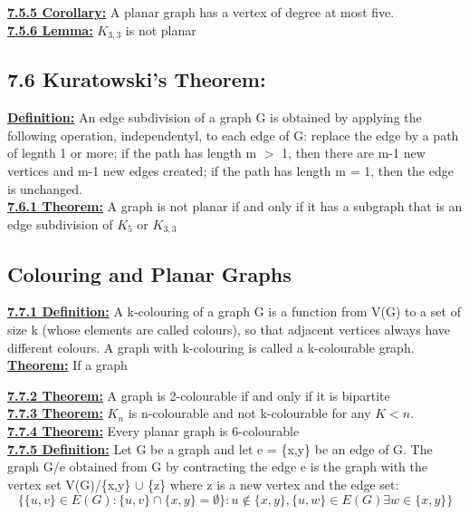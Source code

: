 \documentclass[12pt]{article}
\newcommand{\myt}[1]{\textbf{\underline{#1}}}
\begin{document}
	\myt{7.5.5 Corollary:} A planar graph has a vertex of degree at most five.\\
	
	\myt{7.5.6 Lemma:} $K_{3,3}$ is not planar\\
	
	\subsection*{7.6 Kuratowski's Theorem:}
	
	\myt{Definition:} An edge subdivision of a graph G is obtained by applying the following operation, independentyl, to each edge of G: replace the edge by a path of legnth 1 or more; if the path has length m $>$ 1, then there are m-1 new vertices and m-1 new edges created; if the path has length m = 1, then the edge is unchanged.\\
	
	\myt{7.6.1 Theorem:} A graph is not planar if and only if it has a subgraph that is an edge subdivision of $K_5$ or $K_{3,3}$\\
	
	\subsection*{Colouring and Planar Graphs}
	\myt{7.7.1 Definition:} A k-colouring of a graph G is a function from V(G) to a set of size k (whose elements are called colours), so that adjacent vertices always have different colours. A graph with k-colouring is called a k-colourable graph.\\
	
	\myt{Theorem:} If a graph 
	
	\myt{7.7.2 Theorem:} A graph is 2-colourable if and only if it is bipartite\\
	
	\myt{7.7.3 Theorem:} $K_n$ is n-colourable and not k-colourable for any $K < n$.\\
	
	\myt{7.7.4 Theorem:} Every planar graph is 6-colourable\\
	
	\myt{7.7.5 Definition:} Let G be a graph and let e = \{x,y\} be an edge of G. The graph G/e obtained from G by contracting the edge e is the graph with the vertex set V(G)/\{x,y\} $\cup$ \{z\} where z is a new vertex and the edge set:\\
	$$\{\{u,v\} \in E(G) : \{u,v\} \cap \{x,y\} = \emptyset\}: u \notin \{x,y\},\{u,w\} \in E(G) \exists w \in \{x,y\}\}$$
	
\end{document}
